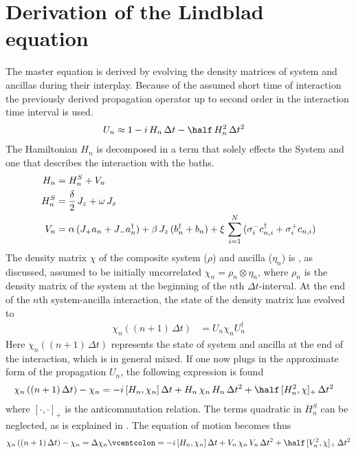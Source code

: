 \section[Lindblad equation]{Derivation of the Lindblad equation}
The master equation is derived by evolving the density matrices of system and ancillas during their interplay. Because of the assumed short time of interaction the previously derived propagation operator up to second order in the interaction time interval is used.
\begin{align}
    U_n &\approx 1-i\,H_n \,\Delta t-\half\,H_n^2\,\Delta t^2
\end{align}
The Hamiltonian $H_n$ is decomposed in a term that solely effects the System and one that describes the interaction with the baths.
\begin{align}\label{eq:Ham_split}
    H_n &= H_n^S + V_n\notag\\
    H_n^S&=\frac{\delta}{2}\,J_z+\omega\,J_x\notag\\
    V_n&= \alpha\,(J_+a_n + J_-a_n^\dagger)+ \beta\,J_z\,(b_n^\dagger+b_n)+\xi\,\sum_{i=1}^N\,(\sigma_{i}^-c_{n,i}^\dagger+\sigma_i^+c_{n,i})
\end{align}
The density matrix $\chi$ of the composite system ($\rho$) and ancilla ($\eta_n$) is , as discussed, assumed to be initially uncorrelated $\chi_n=\rho_n\otimes\eta_n$, where $\rho_n$ is the density matrix of the system at the beginning of the $n$th $\Delta t$-interval. At the end of the $n$th system-ancilla interaction, the state of the density matrix has evolved to
\begin{align*}
    \chi_n\left((n+1)\,\Delta t\right)&=U_n\chi_nU_n^\dagger
\end{align*}
Here $ \chi_n((n+1)\,\Delta t)$ represents the state of system and ancilla at the end of the interaction, which is in general mixed.
If one now plugs in the approximate form of the propagation $U_n$, the following expression is found
\begin{align*}
    \chi_n\left((n+1)\,\Delta t\right)-\chi_n&=-i\,[H_n,\chi_n]\,\Delta t+H_n\,\chi_n\,H_n\,\Delta t^2+\half\,[H_n^2,\chi]_+\,\Delta t^2
\end{align*}
where $[\cdot,\cdot]_+$ is the anticommutation relation. The terms quadratic in $H_n^S$ can be neglected, as is explained in \cite{ciccarello_quantum_2022}. The equation of motion becomes thus
\begin{align}
    \chi_n\left((n+1)\,\Delta t\right)-\chi_n=\Delta\chi_n\vcentcolon=-i\,[H_n,\chi_n]\,\Delta t+V_n\,\chi_n\,V_n\,\Delta t^2+\half\,[V_n^2,\chi]_+\,\Delta t^2\label{eq:pre_lindblad}
\end{align}

